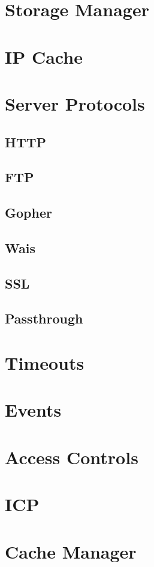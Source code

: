 \chapter{Storage Manager}

\chapter{IP Cache}

\chapter{Server Protocols}
\section{HTTP}
\section{FTP}
\section{Gopher}
\section{Wais}
\section{SSL}
\section{Passthrough}

\chapter{Timeouts}

\chapter{Events}

\chapter{Access Controls}

\chapter{ICP}

\chapter{Cache Manager}

\newpage 


\nocite{rfc850}
\nocite{rfc1123}


